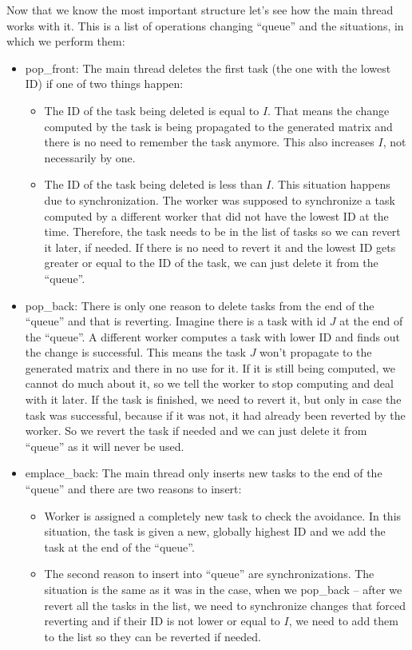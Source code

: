 Now that we know the most important structure let's see how the main thread works with it. This is a list of operations changing ``queue'' and the situations, in which we perform them:
\begin{itemize}
\item pop\_front: The main thread deletes the first task (the one with the lowest ID) if one of two things happen:
\begin{itemize}
\item The ID of the task being deleted is equal to $I$. That means the change computed by the task is being propagated to the generated matrix and there is no need to remember the task anymore. This also increases $I$, not necessarily by one.
\item The ID of the task being deleted is less than $I$. This situation happens due to synchronization. The worker was supposed to synchronize a task computed by a different worker that did not have the lowest ID at the time. Therefore, the task needs to be in the list of tasks so we can revert it later, if needed. If there is no need to revert it and the lowest ID gets greater or equal to the ID of the task, we can just delete it from the ``queue''.
\end{itemize}
\item pop\_back: There is only one reason to delete tasks from the end of the ``queue'' and that is reverting. Imagine there is a task with id $J$ at the end of the ``queue''. A different worker computes a task with lower ID and finds out the change is successful. This means the task $J$ won't propagate to the generated matrix and there in no use for it. If it is still being computed, we cannot do much about it, so we tell the worker to stop computing and deal with it later. If the task is finished, we need to revert it, but only in case the task was successful, because if it was not, it had already been reverted by the worker. So we revert the task if needed and we can just delete it from ``queue'' as it will never be used.
\item emplace\_back: The main thread only inserts new tasks to the end of the ``queue'' and there are two reasons to insert:
\begin{itemize}
\item Worker is assigned a completely new task to check the avoidance. In this situation, the task is given a new, globally highest ID and we add the task at the end of the ``queue''.
\item The second reason to insert into ``queue'' are synchronizations. The situation is the same as it was in the case, when we pop\_back -- after we revert all the tasks in the list, we need to synchronize changes that forced reverting and if their ID is not lower or equal to $I$, we need to add them to the list so they can be reverted if needed.
\end{itemize}
\end{itemize}